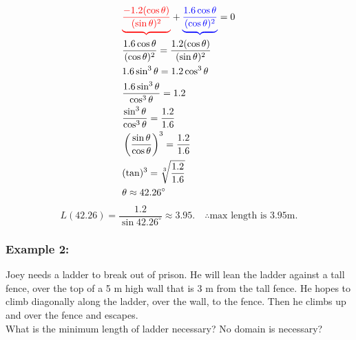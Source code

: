 \documentclass{article}
\begin{document}
\begin{align*}
    & \textcolor{red}{\underbrace{\frac{-1.2(\cos \theta )}{(\sin \theta)^2}}} + \textcolor{blue}{\underbrace{\frac{1.6 \cos \theta }{(\cos \theta)^2}}} = 0 \\
    & \frac{1.6 \cos \theta }{(\cos \theta)^2} = \frac{1.2(\cos \theta )}{(\sin \theta)^2} \\
    & 1.6 \sin^3\theta = 1.2 \cos ^3 \theta \\
    & \frac{1.6 \sin^3 \theta}{\cos ^3\theta} = 1.2 \\
    & \frac{\sin^3 \theta}{\cos ^3\theta} = \frac{1.2}{1.6} \\
    & \left(\frac{\sin \theta }{\cos \theta}\right)^3 = \frac{1.2}{1.6} \\
    & (\tan)^3 = \sqrt[3]{\frac{1.2}{1.6}} \\
    & \theta \approx 42.26^{\circ}
\end{align*}
\[
L(42.26) = \frac{1.2}{\sin 42.26^{\circ}} \approx 3.95. \quad \therefore \text{max length is 3.95m.}
\]
\newpage
\subsubsection*{Example 2:}
Joey needs a ladder to break out of prison. He will lean the ladder against a tall fence, over the top of a 5 m high wall that is 3 m from the tall fence. He hopes to climb diagonally along the ladder, over the wall, to the fence. Then he climbs up and over the fence and escapes.\\
What is the minimum length of ladder necessary? No domain is necessary? 
\end{document}
